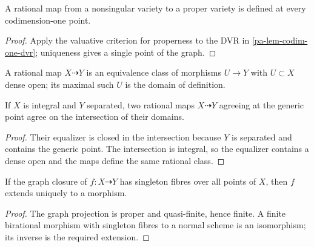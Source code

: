 \begin{lemma}
  \label{pa-lem-valuative-extension}
  \cite{milne-av}
  A rational map from a nonsingular variety to a proper variety is defined at
  every codimension-one point.
\end{lemma}

\begin{proof}
  Apply the valuative criterion for properness to the DVR in
  \ref{pa-lem-codim-one-dvr}; uniqueness gives a single point of the graph.
\end{proof}

\begin{definition}
  \label{pa-def-rational-map}
  \cite{milne-av}
  A rational map \(X\dashrightarrow Y\) is an equivalence class of morphisms
  \(U\to Y\) with \(U\subset X\) dense open; its maximal such \(U\) is the
  domain of definition.
\end{definition}

\begin{lemma}
  \label{pa-lem-rational-generic}
  \cite{milne-av}
  If \(X\) is integral and \(Y\) separated, two rational maps \(X\dashrightarrow
  Y\) agreeing at the generic point agree on the intersection of their domains.
\end{lemma}

\begin{proof}
  Their equalizer is closed in the intersection because \(Y\) is separated and
  contains the generic point.  The intersection is integral, so the equalizer
  contains a dense open and the maps define the same rational class.
\end{proof}

\begin{lemma}
  \label{pa-lem-empty-indeterminacy}
  \cite{milne-av}
  If the graph closure of \(f:X\dashrightarrow Y\) has singleton fibres over
  all points of \(X\), then \(f\) extends uniquely to a morphism.
\end{lemma}

\begin{proof}
  The graph projection is proper and quasi-finite, hence finite.  A finite
  birational morphism with singleton fibres to a normal scheme is an
  isomorphism; its inverse is the required extension.
\end{proof}


